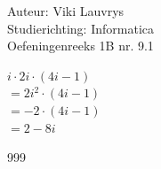 \documentclass[a4paper]{article}
\begin{document}
  
\noindent \large Auteur: Viki Lauvrys        \\
\noindent \large Studierichting: Informatica \\
\noindent \large Oefeningenreeks 1B nr. 9.1 \\

\medskip

\normalsize

$ i \cdot 2i \cdot (4i -1) $ \\

$ = 2i^2 \cdot (4i -1) $ \\

$ = -2 \cdot (4i -1) $ \\

$ = 2 - 8i $ \\

\begin{thebibliography}{999}
\end{thebibliography}
\end{document}
